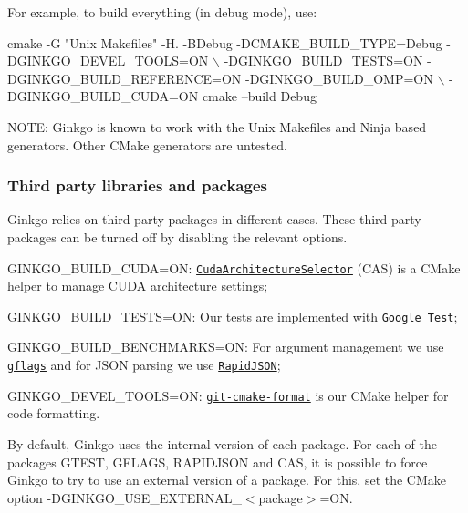 For example, to build everything (in debug mode), use\+:


\begin{DoxyCode}
cmake  -G "Unix Makefiles" -H. -BDebug -DCMAKE\_BUILD\_TYPE=Debug -DGINKGO\_DEVEL\_TOOLS=ON \(\backslash\)
              -DGINKGO\_BUILD\_TESTS=ON -DGINKGO\_BUILD\_REFERENCE=ON -DGINKGO\_BUILD\_OMP=ON \(\backslash\)
              -DGINKGO\_BUILD\_CUDA=ON 
cmake --build Debug
\end{DoxyCode}


N\+O\+TE\+: Ginkgo is known to work with the {\ttfamily Unix Makefiles} and {\ttfamily Ninja} based generators. Other C\+Make generators are untested.

\subsubsection*{Third party libraries and packages}

Ginkgo relies on third party packages in different cases. These third party packages can be turned off by disabling the relevant options.


\begin{DoxyItemize}
\item G\+I\+N\+K\+G\+O\+\_\+\+B\+U\+I\+L\+D\+\_\+\+C\+U\+DA=ON\+: \href{https://github.com/ginkgo-project/CudaArchitectureSelector}{\tt Cuda\+Architecture\+Selector} (C\+AS) is a C\+Make helper to manage C\+U\+DA architecture settings;
\item G\+I\+N\+K\+G\+O\+\_\+\+B\+U\+I\+L\+D\+\_\+\+T\+E\+S\+TS=ON\+: Our tests are implemented with \href{https://github.com/google/googletest}{\tt Google Test};
\item G\+I\+N\+K\+G\+O\+\_\+\+B\+U\+I\+L\+D\+\_\+\+B\+E\+N\+C\+H\+M\+A\+R\+KS=ON\+: For argument management we use \href{https://github.com/gflags/gflags}{\tt gflags} and for J\+S\+ON parsing we use \href{https://github.com/Tencent/rapidjson}{\tt Rapid\+J\+S\+ON};
\item G\+I\+N\+K\+G\+O\+\_\+\+D\+E\+V\+E\+L\+\_\+\+T\+O\+O\+LS=ON\+: \href{https://github.com/gflegar/git-cmake-format}{\tt git-\/cmake-\/format} is our C\+Make helper for code formatting.
\end{DoxyItemize}

By default, Ginkgo uses the internal version of each package. For each of the packages {\ttfamily G\+T\+E\+ST}, {\ttfamily G\+F\+L\+A\+GS}, {\ttfamily R\+A\+P\+I\+D\+J\+S\+ON} and {\ttfamily C\+AS}, it is possible to force Ginkgo to try to use an external version of a package. For this, set the C\+Make option {\ttfamily -\/\+D\+G\+I\+N\+K\+G\+O\+\_\+\+U\+S\+E\+\_\+\+E\+X\+T\+E\+R\+N\+A\+L\+\_\+$<$package$>$=ON}.


